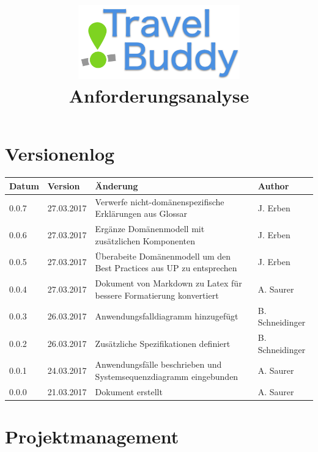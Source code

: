 \documentclass[a4paper,10pt,xetex]{article}
\title{
  \includegraphics[width=7cm]{travel-buddy_white}\\[\bigskipamount]
  Anforderungsanalyse\\[\bigskipamount]
}
\author{\documentauthors}
\date{\parbox{\linewidth}{\centering%
  IT15TA ZH \hspace*{3cm} Gruppe 3\endgraf\bigskip
  \documentdate\endgraf
}}
\begin{document}
\maketitle\newpage

{
\hypersetup{linkcolor=black}
\setcounter{tocdepth}{3}
\tableofcontents
}

\newpage

\section{Versionenlog}\label{versionenlog}

\tabulinesep=1.2mm

\begin{longtabu} to \textwidth { | l | l | X[l] | l | }
  \hline
  \textbf{Datum} & \textbf{Version} & \textbf{Änderung} & \textbf{Author} \\
  \hline
  \endhead

  0.0.7 & 27.03.2017 & Verwerfe nicht-domänenspezifische Erklärungen aus Glossar & J. Erben\\
  \hline


  0.0.6 & 27.03.2017 & Ergänze Domänenmodell mit zusätzlichen Komponenten & J. Erben\\
  \hline

  0.0.5 & 27.03.2017 & Überabeite Domänenmodell um den Best Practices aus UP zu entsprechen & J. Erben\\
  \hline

  0.0.4 & 27.03.2017 & Dokument von Markdown zu Latex für bessere Formatierung konvertiert & A. Saurer\\
  \hline

  0.0.3 & 26.03.2017 & Anwendungsfalldiagramm hinzugefügt & B. Schneidinger\\
  \hline

  0.0.2 & 26.03.2017 & Zusätzliche Spezifikationen definiert & B. Schneidinger\\
  \hline

  0.0.1 & 24.03.2017 & Anwendungsfälle beschrieben und Systemsequenzdiagramm eingebunden & A. Saurer\\
  \hline

  0.0.0 & 21.03.2017 & Dokument erstellt & A. Saurer\\
  \hline
\end{longtabu}
\newpage

\section{Projektmanagement}\label{projektmanagement}
\end{document}
